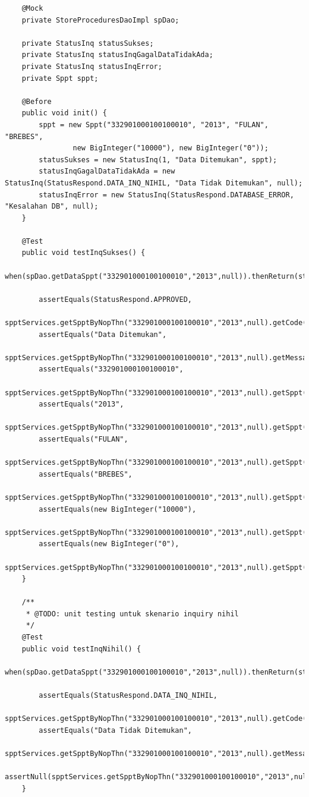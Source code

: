 \documentclass[pdftex,12pt, oneside]{article}
\begin{document}
\begin{enumerate}[A.]
\begin{enumerate}[1.]
\begin{lstlisting}
    @Mock
    private StoreProceduresDaoImpl spDao;

    private StatusInq statusSukses;
    private StatusInq statusInqGagalDataTidakAda;
    private StatusInq statusInqError;
    private Sppt sppt;

    @Before
    public void init() {
        sppt = new Sppt("332901000100100010", "2013", "FULAN", "BREBES",
                new BigInteger("10000"), new BigInteger("0"));
        statusSukses = new StatusInq(1, "Data Ditemukan", sppt);
        statusInqGagalDataTidakAda = new StatusInq(StatusRespond.DATA_INQ_NIHIL, "Data Tidak Ditemukan", null);
        statusInqError = new StatusInq(StatusRespond.DATABASE_ERROR, "Kesalahan DB", null);
    }

    @Test
    public void testInqSukses() {
        when(spDao.getDataSppt("332901000100100010","2013",null)).thenReturn(statusSukses);

        assertEquals(StatusRespond.APPROVED,
                spptServices.getSpptByNopThn("332901000100100010","2013",null).getCode());
        assertEquals("Data Ditemukan",
                spptServices.getSpptByNopThn("332901000100100010","2013",null).getMessage());
        assertEquals("332901000100100010",
                spptServices.getSpptByNopThn("332901000100100010","2013",null).getSppt().getNop());
        assertEquals("2013",
                spptServices.getSpptByNopThn("332901000100100010","2013",null).getSppt().getThn());
        assertEquals("FULAN",
                spptServices.getSpptByNopThn("332901000100100010","2013",null).getSppt().getNama());
        assertEquals("BREBES",
                spptServices.getSpptByNopThn("332901000100100010","2013",null).getSppt().getAlamatOp());
        assertEquals(new BigInteger("10000"),
                spptServices.getSpptByNopThn("332901000100100010","2013",null).getSppt().getPokok());
        assertEquals(new BigInteger("0"),
                spptServices.getSpptByNopThn("332901000100100010","2013",null).getSppt().getDenda());
    }

    /**
     * @TODO: unit testing untuk skenario inquiry nihil
     */
    @Test
    public void testInqNihil() {
        when(spDao.getDataSppt("332901000100100010","2013",null)).thenReturn(statusInqGagalDataTidakAda);

        assertEquals(StatusRespond.DATA_INQ_NIHIL,
                spptServices.getSpptByNopThn("332901000100100010","2013",null).getCode());
        assertEquals("Data Tidak Ditemukan",
                spptServices.getSpptByNopThn("332901000100100010","2013",null).getMessage());
        assertNull(spptServices.getSpptByNopThn("332901000100100010","2013",null).getSppt());
    }


\end{lstlisting}
\end{enumerate}
\end{enumerate}
\end{document}
